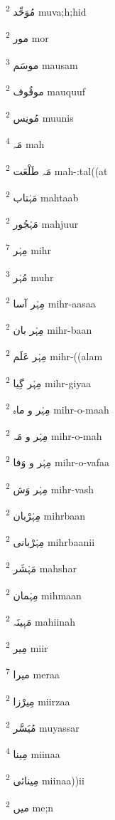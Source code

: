 \documentclass[12pt]{article}
\begin{document}
\begin{multicols}{5}
{\ur مُوَحِّد}   \textsuperscript{2} muva;h;hid

{\ur مور}   \textsuperscript{2} mor

{\ur موسَم}   \textsuperscript{3} mausam

{\ur موقُوف}   \textsuperscript{2} mauquuf

{\ur مُونِس}   \textsuperscript{2} muunis

{\ur مَہ}   \textsuperscript{4} mah

{\ur مَہ طَلْعَت}   \textsuperscript{2} mah-:tal((at

{\ur مَہْتاب}   \textsuperscript{2} mahtaab

{\ur مَہْجُور}   \textsuperscript{2} mahjuur

{\ur مِہْر}   \textsuperscript{7} mihr

{\ur مُہْر}   \textsuperscript{3} muhr

{\ur مِہْر آسا}   \textsuperscript{2} mihr-aasaa

{\ur مِہْر بان}   \textsuperscript{2} mihr-baan

{\ur مِہْر عَلَم}   \textsuperscript{2} mihr-((alam

{\ur مِہْر گِیا}   \textsuperscript{2} mihr-giyaa

{\ur مِہْر و ماہ}   \textsuperscript{2} mihr-o-maah

{\ur مِہْر و مَہ}   \textsuperscript{2} mihr-o-mah

{\ur مِہْر و وَفا}   \textsuperscript{2} mihr-o-vafaa

{\ur مِہْر وَش}   \textsuperscript{2} mihr-vash

{\ur مِہْرْبان}   \textsuperscript{2} mihrbaan

{\ur مِہْرْبانی}   \textsuperscript{2} mihrbaanii

{\ur مَہْشَر}   \textsuperscript{2} mahshar

{\ur مِہْمان}   \textsuperscript{2} mihmaan

{\ur مَہِینَہ}   \textsuperscript{2} mahiinah

{\ur مِیر}   \textsuperscript{2} miir

{\ur میرا}   \textsuperscript{7} meraa

{\ur مِیرْزا}   \textsuperscript{2} miirzaa

{\ur مُیَسَّر}   \textsuperscript{2} muyassar

{\ur مِینا}   \textsuperscript{4} miinaa

{\ur مِینائی}   \textsuperscript{2} miinaa))ii

{\ur میں}   \textsuperscript{2} me;n


\end{multicols}
\end{document}
